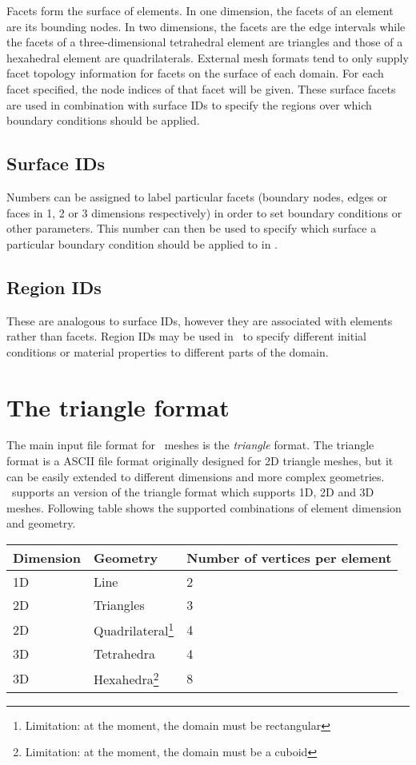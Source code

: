 Facets form the surface of elements. In one dimension, the facets of an
element are its bounding nodes. In two dimensions, the facets are the edge
intervals while the facets of a three-dimensional tetrahedral element are
triangles and those of a hexahedral element are quadrilaterals. External
mesh formats tend to only supply facet topology information for facets on
the surface of each domain. For each facet specified, the node indices of
that facet will be given. These surface facets are used in combination with
surface IDs to specify the regions over which boundary conditions should be
applied.

\subsection{Surface IDs}\label{sect:surface_ids}
Numbers can be assigned to label particular facets (boundary nodes, edges or
faces in 1, 2 or 3 dimensions respectively) in order to set
boundary conditions or other parameters. This number can then be used to
specify which surface a particular boundary condition should be applied to
in \fluidity. 

\subsection{Region IDs}\label{sect:region_ids}
 These are analogous to surface IDs, however they are
associated with elements rather than facets. Region IDs may be used in
\fluidity\ to specify different initial conditions or material properties to
different parts of the domain.



\section{The triangle format}\label{sect:triangle_format}

The main input file format for \fluidity\ meshes is the \emph{triangle} format.
The triangle format is a ASCII file format originally designed for 2D
triangle meshes, but it can be easily extended to different dimensions and
more complex geometries.  \fluidity\ supports an version of the triangle format
which supports 1D, 2D and 3D meshes.  Following table shows the supported
combinations of element dimension and geometry.

\begin{tabular}{ l l l }
\textbf{Dimension} & \textbf{Geometry} & \textbf{Number of vertices per element} \\ \hline
1D & Line & 2\\ 
2D & Triangles &  3 \\ 
2D & Quadrilateral\footnote{Limitation: at the moment, the domain must be rectangular} & 4 \\
3D & Tetrahedra & 4 \\ 
3D & Hexahedra\footnote{Limitation: at the moment, the domain must be a cuboid} & 8 \\
\end{tabular}

